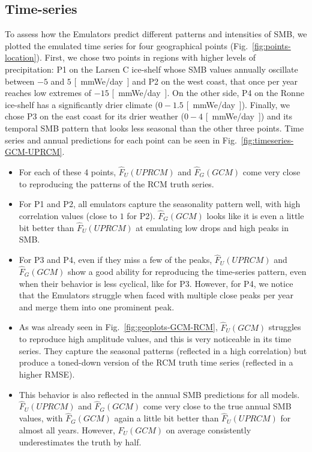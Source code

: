 \documentclass[a4paper,11pt,oneside]{report}
\begin{document}
\subsection{Time-series}\label{sec:res-time-series}
To assess how the Emulators predict different patterns and intensities of SMB, we plotted the emulated time series for four geographical points (Fig.~\ref{fig:points-location}). First, we chose two points in regions with higher levels of precipitation: P1 on the Larsen C ice-shelf whose SMB values annually oscillate between $-5$ and $5$ \si{[mmWe/day]} and P2 on the west coast, that once per year reaches low extremes of $-15$ \si{[mmWe/day]}. On the other side, P4 on the Ronne ice-shelf has a significantly drier climate ($0-1.5$ \si{[mmWe/day]}). Finally, we chose P3 on the east coast for its drier weather ($0-4$ \si{[mmWe/day]}) and its temporal SMB pattern that looks less seasonal than the other three points. Time series and annual predictions for each point can be seen in Fig.~\ref{fig:timeseries-GCM-UPRCM}. 
\begin{itemize}
    \item For each of these 4 points, $\hat{F}_{U}(UPRCM)$ and $\hat{F}_{G}(GCM)$ come very close to reproducing the patterns of the RCM truth series. 
    \item For P1 and P2, all emulators capture the seasonality pattern well, with high correlation values (close to $1$ for P2). $\hat{F}_{G}(GCM)$ looks like it is even a little bit better than $\hat{F}_{U}(UPRCM)$ at emulating low drops and high peaks in SMB. 
    \item For P3 and P4, even if they miss a few of the peaks, $\hat{F}_{U}(UPRCM)$ and $\hat{F}_{G}(GCM)$ show a good ability for reproducing the time-series pattern, even when their behavior is less cyclical, like for P3. However, for P4, we notice that the Emulators struggle when faced with multiple close peaks per year and merge them into one prominent peak. 
    \item As was already seen in Fig.~\ref{fig:geoplots-GCM-RCM}, $\hat{F}_{U}(GCM)$ struggles to reproduce high amplitude values, and this is very noticeable in its time series. They capture the seasonal patterns (reflected in a high correlation) but produce a toned-down version of the RCM truth time series (reflected in a higher RMSE).
    \item This behavior is also reflected in the annual SMB predictions for all models. $\hat{F}_{U}(UPRCM)$ and $\hat{F}_{G}(GCM)$ come very close to the true annual SMB values, with $\hat{F}_{G}(GCM)$ again a little bit better than $\hat{F}_{U}(UPRCM)$ for almost all years. However, $\hat{F}_{U}(GCM)$ on average consistently underestimates the truth by half. 

\end{itemize}
\end{document}
